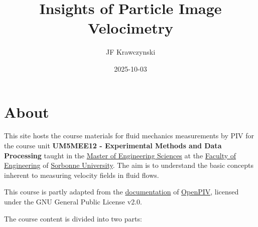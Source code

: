 \documentclass[
  english,
  letterpaper,
  numbers=noendperiod,
  DIV=13]{scrreprt}
\title{Insights of Particle Image Velocimetry}
\author{JF Krawczynski}
\date{2025-10-03}
\renewcommand*\contentsname{Table of contents}
\newcommand\contentsname{Table of contents}
\begin{document}
\maketitle

\renewcommand*\contentsname{Table of contents}
{
\hypersetup{linkcolor=}
\setcounter{tocdepth}{2}
\tableofcontents
}


\chapter*{About}\label{about}


This site hosts the course materials for fluid mechanics measurements by
PIV for the course unit \textbf{UM5MEE12 - Experimental Methods and Data
Processing} taught in the
\href{https://masters-sdi.sorbonne-universite.fr/la-mention-mecanique}{Master
of Engineering Sciences} at the
\href{https://sciences.sorbonne-universite.fr/faculte/ufr-instituts-observatoires-ecoles/ufr-dingenierie}{Faculty
of Engineering} of \href{https://www.sorbonne-universite.fr/}{Sorbonne
University}. The aim is to understand the basic concepts inherent to
measuring velocity fields in fluid flows.

\begin{tcolorbox}[enhanced jigsaw, leftrule=.75mm, arc=.35mm, bottomrule=.15mm, colback=white, breakable, opacityback=0, colframe=quarto-callout-note-color-frame, title=\textcolor{quarto-callout-note-color}{\faInfo}\hspace{0.5em}{Note}, toprule=.15mm, coltitle=black, opacitybacktitle=0.6, titlerule=0mm, bottomtitle=1mm, colbacktitle=quarto-callout-note-color!10!white, toptitle=1mm, rightrule=.15mm, left=2mm]

This course is partly adapted from the
\href{https://github.com/OpenPIV/openpiv-python}{documentation} of
\href{https://doi.org/10.5281/zenodo.4409178}{OpenPIV}, licensed under
the GNU General Public License v2.0.

\end{tcolorbox}

The course content is divided into two parts:
\end{document}

